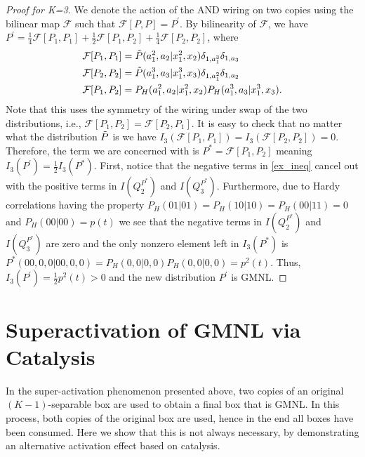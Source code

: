 \documentclass[pra,aps,reprint,superscriptaddress]{revtex4-2}
\theoremstyle{theorem}
\begin{document}
\begin{proof}[Proof for K=3]
We denote the action of the AND wiring on two copies using the bilinear map $\mathcal{F}$ such that $\mathcal{F}[P,P]= P^\prime$. By bilinearity of $\mathcal{F}$, we have $P^\prime = \frac{1}{4}\mathcal{F}[P_1,P_1] + \frac{1}{2}\mathcal{F}[P_1,P_2] + \frac{1}{4}\mathcal{F}[P_2,P_2]$, where
\begin{align}
    \mathcal{F}[P_1,P_1] &= \Tilde{P}(a_1^2,a_2|x^2_1,x_2)\delta_{1,a_1^{3}}\delta_{1,a_3}\\
    \mathcal{F}[P_2,P_2] &= \Tilde{P}(a_1^3,a_3|x^3_1,x_3)\delta_{1,a_1^{2}}\delta_{1,a_2}\\
    \mathcal{F}[P_1,P_2] &=P_H(a_1^2,a_2|x^2_1,x_2)P_H(a_1^3,a_3|x^3_1,x_3).
\end{align}
Note that this uses the symmetry of the wiring under swap of the two distributions, i.e., $\mathcal{F}[P_1,P_2]=\mathcal{F}[P_2,P_1]$.  It is easy to check that no matter what the distribution $\Tilde{P}$ is we have $I_3\left(\mathcal{F}[P_1,P_1]\right) = I_3\left(\mathcal{F}[P_2,P_2]\right) = 0$. Therefore, the term we are concerned with is $P^*=\mathcal{F}[P_1,P_2]$ meaning $I_3(P^\prime) = \frac{1}{2}I_3\left(P^*\right)$. First, notice that the negative terms in \eqref{ex_ineq} cancel out with the positive terms in $I\left(Q_2^{P^*}\right)$ and $I\left(Q_3^{P^*}\right)$. Furthermore, due to Hardy correlations having the property $P_H(01|01)=P_H(10|10)=P_H(00|11)=0$ and $P_H(00|00)=p(t)$ we see that the negative terms in  $I\left(Q_2^{P^*}\right)$ and $I\left(Q_3^{P^*}\right)$ are zero and the only nonzero element left in $I_3(P^*)$ is $P^* (00,0,0|00,0,0) = P_H(0,0|0,0)P_H(0,0|0,0)= p^2(t)$. Thus, $I_3(P^\prime)=\frac{1}{2}p^2(t)>0$ and the new distribution $P^\prime$ is GMNL.
\end{proof}

\section{Superactivation of GMNL via Catalysis}

In the super-activation phenomenon presented above, two copies of an original $(K-1)$-separable box are used to obtain a final box that is GMNL. In this process, both copies of the original box are used, hence in the end all boxes have been consumed. Here we show that this is not always necessary, by demonstrating an alternative activation effect based on catalysis. 
\end{document}
